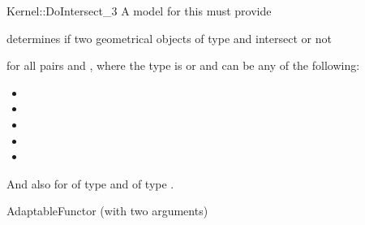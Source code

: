 \begin{ccRefFunctionObjectConcept}{Kernel::DoIntersect_3}
A model for this must provide


{determines if two geometrical objects of type 
 and  intersect or not}

for all pairs  and , where
the type  is  or
 and 
 can be any of the following:
\begin{itemize}
\item {}
\item {}
\item {}
\item {}
\item {}
\end{itemize}
And also for  of type  and  of type .

\ccRefines
AdaptableFunctor (with two arguments)

\ccSeeAlso
{}\\

\end{ccRefFunctionObjectConcept}
